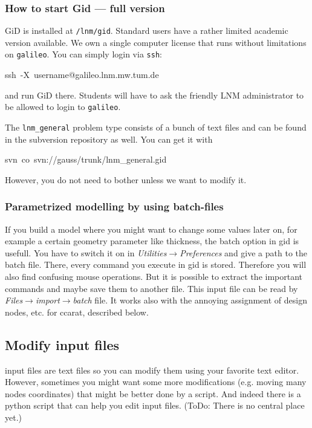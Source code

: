 \subsubsection{How to start Gid --- full version}
GiD is installed at \texttt{/lnm/gid}. Standard users have a rather
limited academic version available. We own a single computer license
that runs without limitations on \texttt{galileo}. You can simply
login via \texttt{ssh}:

\begin{lyxcode}
ssh~-X~username@galileo.lnm.mw.tum.de
\end{lyxcode}
and run GiD there. Students will have to ask the friendly LNM administrator
to be allowed to login to \texttt{galileo}.

The \texttt{lnm\_general} problem type consists of a bunch of text
files and can be found in the subversion repository as well. You can
get it with

\begin{lyxcode}
svn~co~svn://gauss/trunk/lnm\_general.gid
\end{lyxcode}
However, you do not need to bother unless we want to modify it.




\subsubsection{Parametrized modelling by using batch-files}

If you build a model where you might want to change some values later
on, for example a certain geometry parameter like thickness, the batch
option in gid is usefull. You have to switch it on in \emph{Utilities$\rightarrow$Preferences}
and give a path to the batch file. There, every command you execute
in gid is stored. Therefore you will also find confusing mouse operations.
But it is possible to extract the important commands and maybe save
them to another file. This input file can be read by \emph{Files$\rightarrow$import$\rightarrow$batch}
file. It works also with the annoying assignment of design nodes,
etc. for ccarat, described below.

\subsection{Modify \ccarat{} input files}

\ccarat{} input files are text files so you can modify them using
your favorite text editor. However, sometimes you might want some
more modifications (e.g. moving many nodes coordinates) that might
be better done by a script. And indeed there is a python script that
can help you edit input files. (ToDo: There is no central place yet.)


